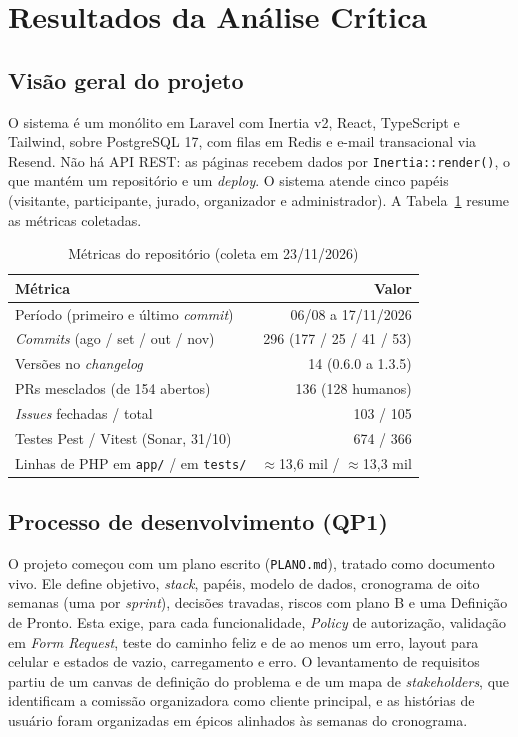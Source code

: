 \section{Resultados da Análise Crítica}
\label{sec:res}

\subsection{Visão geral do projeto}

O sistema é um monólito em Laravel com Inertia v2, React, TypeScript e Tailwind, sobre PostgreSQL 17, com filas em Redis e e-mail transacional via Resend. Não há API REST: as páginas recebem dados por \texttt{Inertia::render()}, o que mantém um repositório e um \textit{deploy}. O sistema atende cinco papéis (visitante, participante, jurado, organizador e administrador). A Tabela~\ref{tab:metricas} resume as métricas coletadas.

\begin{table}[ht]
\centering
\caption{Métricas do repositório (coleta em 23/11/2026)}
\label{tab:metricas}
\begin{tabular}{|l|r|}
\hline
\textbf{Métrica} & \textbf{Valor} \\ \hline
Período (primeiro e último \textit{commit}) & 06/08 a 17/11/2026 \\ \hline
\textit{Commits} (ago / set / out / nov) & 296 (177 / 25 / 41 / 53) \\ \hline
Versões no \textit{changelog} & 14 (0.6.0 a 1.3.5) \\ \hline
PRs mesclados (de 154 abertos) & 136 (128 humanos) \\ \hline
\textit{Issues} fechadas / total & 103 / 105 \\ \hline
Testes Pest / Vitest (Sonar, 31/10) & 674 / 366 \\ \hline
Linhas de PHP em \texttt{app/} / em \texttt{tests/} & $\approx$13,6 mil / $\approx$13,3 mil \\ \hline
\end{tabular}
\end{table}

\subsection{Processo de desenvolvimento (QP1)}

O projeto começou com um plano escrito (\texttt{PLANO.md}), tratado como documento vivo. Ele define objetivo, \textit{stack}, papéis, modelo de dados, cronograma de oito semanas (uma por \textit{sprint}), decisões travadas, riscos com plano B e uma Definição de Pronto. Esta exige, para cada funcionalidade, \textit{Policy} de autorização, validação em \textit{Form Request}, teste do caminho feliz e de ao menos um erro, layout para celular e estados de vazio, carregamento e erro. O levantamento de requisitos partiu de um canvas de definição do problema e de um mapa de \textit{stakeholders}, que identificam a comissão organizadora como cliente principal, e as histórias de usuário foram organizadas em épicos alinhados às semanas do cronograma.


